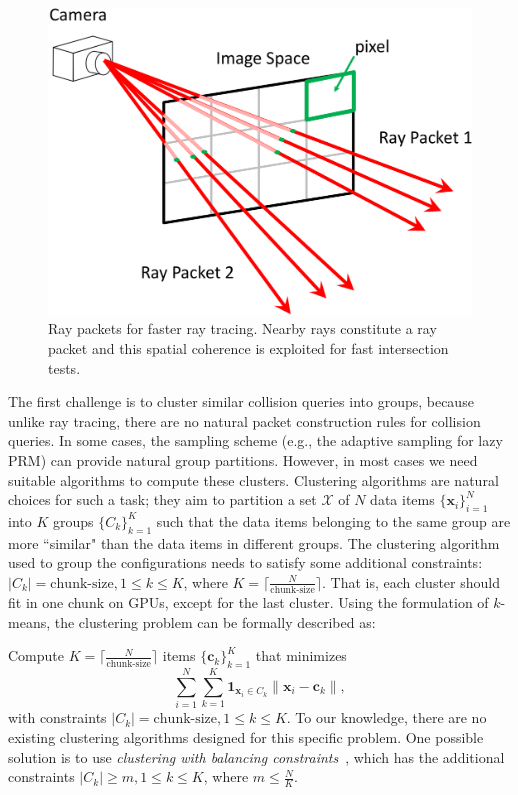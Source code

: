 \begin{figure}[!htb]
  \centering
  \includegraphics[width=\linewidth]{figs/5/raypacket.pdf}
  \caption[Ray packets for faster GPU-based ray tracing]{Ray packets for faster ray tracing. Nearby rays constitute a ray packet and this spatial coherence is
  exploited for fast intersection tests.}
  \label{fig:5:raypacket}
\end{figure}

The first challenge is to cluster similar collision queries into groups, because unlike
ray tracing, there are no natural packet construction rules for collision queries. In some cases, the sampling scheme (e.g., the adaptive sampling for lazy PRM) can provide natural group partitions. However, in most cases
we need suitable algorithms to compute these clusters. Clustering algorithms are natural choices for such a task; they aim
to partition a set $\mathcal{X}$ of $N$ data items $\{\mathbf{x}_i\}_{i=1}^N$ into $K$ groups $\{C_k\}_{k=1}^K$ such that the data items belonging to the same group are more ``similar" than the data items in different groups. The clustering algorithm
used to group the configurations needs to satisfy some additional constraints: $|C_k| = \text{chunk-size}, 1\leq k \leq K$, where $K = \lceil \frac{N}{\text{chunk-size}} \rceil$. That is, each cluster should fit in one chunk on GPUs, except for the last cluster. Using the formulation of $k$-means, the clustering problem can be formally described as:

\noindent Compute $K = \lceil \frac{N}{\text{chunk-size}} \rceil$ items $\{\mathbf{c}_k\}_{k=1}^K$ that minimizes
\begin{equation}
\label{eq:5:cluster}
\sum_{i=1}^N\sum_{k=1}^K \mathbf{1}_{\mathbf{x}_i \in C_k} \|\mathbf{x}_i - \mathbf{c}_k\|,
\end{equation}
with constraints $|C_k| = \text{chunk-size}, 1\leq k \leq K$. To our knowledge, there are no existing clustering algorithms designed
for this specific problem. One possible solution is to use \emph{clustering with balancing constraints}~\cite{Banerjee:2006},
which has the additional constraints $|C_k| \geq m, 1\leq k \leq K$, where $m \leq \frac{N}{K}$.

